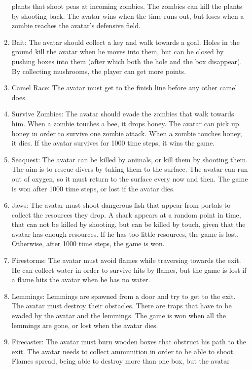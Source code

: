 \begin{enumerate}
		plants that shoot peas at incoming zombies. The zombies can kill the
		plants by shooting back. The avatar wins when the time runs out, but
		loses when a zombie reaches the avatar's defensive field.
	\item Bait: 
		The avatar should collect a key and walk towards a goal. Holes in the
		ground kill the avatar when he moves into them, but can be closed by
		pushing boxes into them (after which both the hole and the box
		disappear). By collecting mushrooms, the player can get more points.
	\item Camel Race:
		The avatar must get to the finish line before any other camel does.
	\item Survive Zombies:
		The avatar should evade the zombies that walk towards him. When a zombie
		touches a bee, it drops honey. The avatar can pick up honey in order to
		survive one zombie attack. When a zombie touches honey, it dies. If the
		avatar survives for 1000 time steps, it wins the game.
	\item Seaquest:
		The avatar can be killed by animals, or kill them by shooting them. The
		aim is to  rescue divers by taking them to the surface. The avatar can
		run out of oxygen, so it must return to the surface every now and then.
		The game is won after 1000 time steps, or lost if the avatar dies.
	\item Jaws:
		The avatar must shoot dangerous fish that appear from portals to collect
		the resources they drop.  A shark appears at a random point in time,
		that can not be killed by shooting, but can be killed by touch, given
		that the avatar has enough resources. If he has too little resources,
		the game is lost. Otherwise, after 1000 time steps, the game is won.
	\item Firestorms:
		The avatar must avoid flames while traversing towards the exit. He can
		collect water in order to survive hits by flames, but the game is lost
		if a flame hits the avatar when he has no water. 
	\item Lemmings:
		Lemmings are spawned from a door and try to get to the exit. The avatar
		must destroy their obstacles. There are traps that have to be evaded by
		the avatar and the lemmings. The game is won when all the lemmings are
		gone, or lost when the avatar dies.
	\item Firecaster:
		The avatar must burn wooden boxes that obstruct his path to the exit.
		The avatar needs to collect ammunition in order to be able to shoot.
		Flames spread, being able to destroy more than one box, but the avatar

\end{enumerate}
